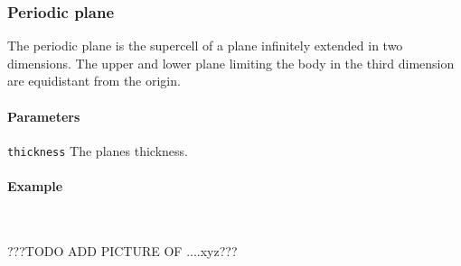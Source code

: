 \subsubsection{Periodic plane}
The periodic plane is the supercell of a plane infinitely extended in two dimensions. The upper and lower plane limiting the body in the third dimension are equidistant from the origin.

\paragraph{Parameters}
\begin{description}
 \item{\lstinline{thickness}} The planes thickness.
\end{description}

\paragraph{Example}\ 


???TODO ADD PICTURE OF ....xyz???